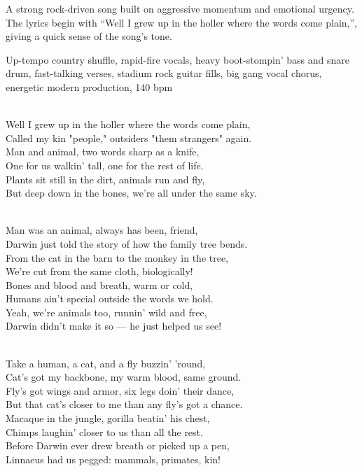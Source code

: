 

\begin{notes}
A strong rock-driven song built on aggressive momentum and emotional urgency. %
The lyrics begin with “Well I grew up in the holler where the words come plain,”, giving a quick sense of the song’s tone.
\end{notes}

\begin{style}
Up-tempo country shuffle, rapid-fire vocals, heavy boot-stompin' bass and snare drum, fast-talking verses, stadium rock guitar fills, big gang vocal chorus, energetic modern production, 140 bpm
\end{style}

\begin{lyrics}
 \\
Well I grew up in the holler where the words come plain,\\
Called my kin "people," outsiders "them strangers" again.\\
Man and animal, two words sharp as a knife,\\
One for us walkin' tall, one for the rest of life.\\
Plants sit still in the dirt, animals run and fly,\\
But deep down in the bones, we're all under the same sky.

 \\
Man was an animal, always has been, friend,\\
Darwin just told the story of how the family tree bends.\\
From the cat in the barn to the monkey in the tree,\\
We're cut from the same cloth, biologically!\\
Bones and blood and breath, warm or cold,\\
Humans ain't special outside the words we hold.\\
Yeah, we're animals too, runnin' wild and free,\\
Darwin didn't make it so — he just helped us see!

 \\
Take a human, a cat, and a fly buzzin' 'round,\\
Cat's got my backbone, my warm blood, same ground.\\
Fly's got wings and armor, six legs doin' their dance,\\
But that cat's closer to me than any fly's got a chance.\\
Macaque in the jungle, gorilla beatin' his chest,\\
Chimps laughin' closer to us than all the rest.\\
Before Darwin ever drew breath or picked up a pen,\\
Linnaeus had us pegged: mammals, primates, kin!


\end{lyrics}
